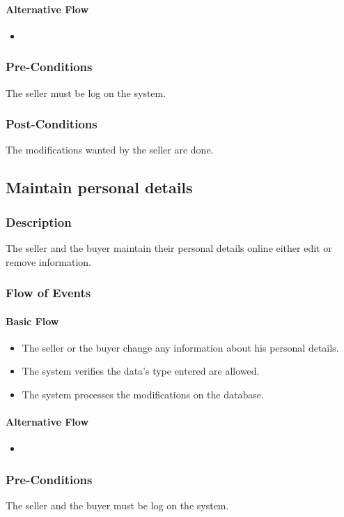 \documentclass[a4paper,12pt]{article}
\begin{document}
\paragraph{Alternative Flow}
\begin{itemize}
\item
\end{itemize}
\subsubsection{Pre-Conditions}
The seller must be log on the system.
\subsubsection{Post-Conditions}
The modifications wanted by the seller are done.

\subsection{Maintain personal details}
\subsubsection{Description}
The seller and the buyer maintain their personal details online either edit or remove information.
\subsubsection{Flow of Events}
\paragraph{Basic Flow}
\begin{itemize}
\item The seller or the buyer change any information about his personal details.
\item The system verifies the data's type entered are allowed.
\item The system processes the modifications on the database.
\end{itemize}
\paragraph{Alternative Flow}
\begin{itemize}
\item
\end{itemize}
\subsubsection{Pre-Conditions}
The seller and the buyer must be log on the system.
\end{document}
